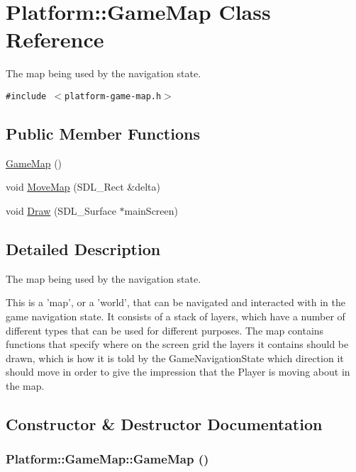 \hypertarget{class_platform_1_1_game_map}{
\section{Platform::GameMap Class Reference}
\label{de/db6/class_platform_1_1_game_map}
}
The map being used by the navigation state.  


{\tt \#include $<$platform-game-map.h$>$}

\subsection*{Public Member Functions}
\begin{CompactItemize}
\item 
\hyperlink{class_platform_1_1_game_map_9388eca457dc888ce1370138b873a29e}{GameMap} ()
\item 
void \hyperlink{class_platform_1_1_game_map_76634e9c99fe04d801cc324ba0b0ed8a}{MoveMap} (SDL\_\-Rect \&delta)
\item 
void \hyperlink{class_platform_1_1_game_map_08581c79e3244f70c4e26b886b0479de}{Draw} (SDL\_\-Surface $\ast$mainScreen)
\end{CompactItemize}


\subsection{Detailed Description}
The map being used by the navigation state. 

This is a 'map', or a 'world', that can be navigated and interacted with in the game navigation state. It consists of a stack of layers, which have a number of different types that can be used for different purposes. The map contains functions that specify where on the screen grid the layers it contains should be drawn, which is how it is told by the GameNavigationState which direction it should move in order to give the impression that the Player is moving about in the map. 

\subsection{Constructor \& Destructor Documentation}
\hypertarget{class_platform_1_1_game_map_9388eca457dc888ce1370138b873a29e}{
\subsubsection[{GameMap}]{\setlength{\rightskip}{0pt plus 5cm}Platform::GameMap::GameMap ()}}
\label{de/db6/class_platform_1_1_game_map_9388eca457dc888ce1370138b873a29e}




